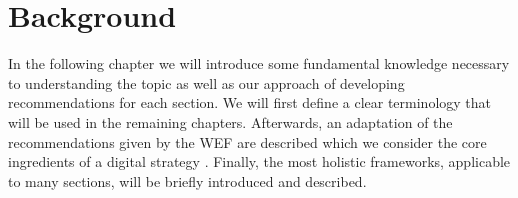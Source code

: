 \section{Background}
In the following chapter we will introduce some fundamental knowledge necessary to understanding the topic as well as our approach of developing recommendations for each section. We will first define a clear terminology that will be used in the remaining chapters. Afterwards, an adaptation of the recommendations given by the \ac{WEF} are described which we consider the core ingredients of a digital strategy \cite{worldforumdigitalenterprise:2016}. Finally, the most holistic frameworks, applicable to many sections, will be briefly introduced and described.

